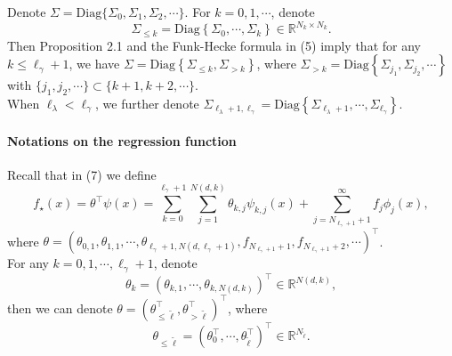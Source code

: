 \documentclass{article}
\theoremstyle{plain}
\theoremstyle{definition}
\theoremstyle{remark}
\newcommand{\dhnote}[1]{{\color{red}[#1]} } %
\begin{document}
\begin{appendix}

Denote $\Sigma = \text{Diag}\{ \Sigma_0, \Sigma_1, \Sigma_2, \cdots\}$. For $k = 0, 1, \cdots$, denote 
$$
\Sigma_{\leq k} = \text{Diag} \left\{\Sigma_{0}, \cdots, \Sigma_{k} \right\} \in \mathbb{R}^{N_{k} \times N_{k}}.
$$
Then Proposition 2.1 and the Funk-Hecke formula in (5) imply that for any $k \leq \ell_{\gamma}+1$, we have $\Sigma = \text{Diag}  \left\{ \Sigma_{\leq k}, \Sigma_{>k} \right\}$, where 
$\Sigma_{>k} = \text{Diag} \left\{\Sigma_{j_1}, \Sigma_{j_2}, \cdots \right\}$ with $\{j_1, j_2, \cdots\} \subset \{k+1, k+2, \cdots\}$.\\
When $\ell_{\lambda}<\ell_{\gamma}$, we further denote $\Sigma_{\ell_{\lambda}+1, \ell_{\gamma}} = \text{Diag} \left\{\Sigma_{\ell_{\lambda}+1}, \cdots, \Sigma_{\ell_{\gamma}} \right\}$.




\paragraph*{Notations on the regression function}
Recall that in (7) we define
\begin{equation*}
    f_{\star}(x) =\theta^{\top}  \psi(x)=\sum_{k=0}^{\ell_{\gamma}+1} \sum_{j=1}^{N(d,k)} \theta_{k,j} \psi_{k,j}(x) + \sum_{j =N_{\ell_{\gamma}+1}+1}^{\infty}f_j \phi_{j}(x),
\end{equation*}
where $\theta = \left( \theta_{0,1}, \theta_{1,1}, \cdots, \theta_{\ell_{\gamma}+1, N(d, \ell_{\gamma}+1)}, f_{N_{\ell_{\gamma}+1}+1}, f_{N_{\ell_{\gamma}+1}+2}, \cdots\right)^{\top}$.\\
For any $k =0, 1, \cdots, \ell_{\gamma}+1$, denote 
\begin{displaymath}
    \theta_{k} = \left( \theta_{k,1}, \cdots, \theta_{k,N(d,k)} \right)^{\top} \in \mathbb{R}^{N(d,k)},
\end{displaymath}
then we can denote $ \theta = \left( \theta^{ \top}_{\leq \tilde{\ell}}, \theta^{\top}_{>\tilde{\ell}} \right)^{\top}$, where
\begin{displaymath}
    \theta_{\leq \tilde{\ell}} = \left( \theta_{0}^{ \top}, \cdots, \theta_{\tilde{\ell}}^{\top} \right)^{\top} \in \mathbb{R}^{N_{\tilde{\ell}}}.
\end{displaymath}




\end{appendix}
\end{document}
